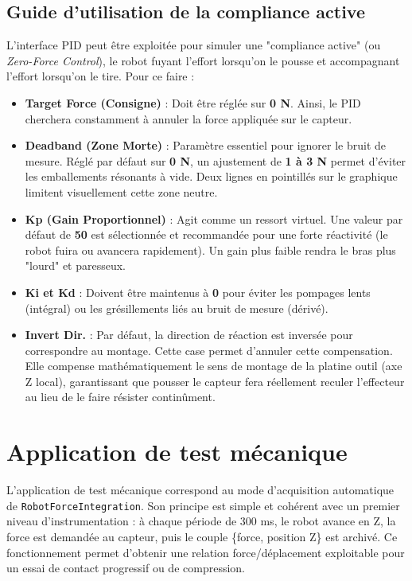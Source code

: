 \documentclass[11pt,a4paper]{article}
\begin{document}
\subsection{Guide d'utilisation de la compliance active}
L'interface PID peut \^etre exploit\'ee pour simuler une "compliance active" (ou \emph{Zero-Force Control}), le robot fuyant l'effort lorsqu'on le pousse et accompagnant l'effort lorsqu'on le tire. Pour ce faire :
\begin{itemize}
    \item \textbf{Target Force (Consigne)} : Doit \^etre r\'egl\'ee sur \textbf{0 N}. Ainsi, le PID cherchera constamment \`a annuler la force appliqu\'ee sur le capteur.
    \item \textbf{Deadband (Zone Morte)} : Param\`etre essentiel pour ignorer le bruit de mesure. R\'egl\'e par d\'efaut sur \textbf{0 N}, un ajustement de \textbf{1 \`a 3 N} permet d'\'eviter les emballements r\'esonants \`a vide. Deux lignes en pointill\'es sur le graphique limitent visuellement cette zone neutre.
    \item \textbf{Kp (Gain Proportionnel)} : Agit comme un ressort virtuel. Une valeur par d\'efaut de \textbf{50} est s\'electionn\'ee et recommand\'ee pour une forte r\'eactivit\'e (le robot fuira ou avancera rapidement). Un gain plus faible rendra le bras plus "lourd" et paresseux.
    \item \textbf{Ki et Kd} : Doivent \^etre maintenus \`a \textbf{0} pour \'eviter les pompages lents (int\'egral) ou les gr\'esillements li\'es au bruit de mesure (d\'eriv\'e).
    \item \textbf{Invert Dir.} : Par d\'efaut, la direction de r\'eaction est invers\'ee pour correspondre au montage. Cette case permet d'annuler cette compensation. Elle compense math\'ematiquement le sens de montage de la platine outil (axe Z local), garantissant que pousser le capteur fera r\'eellement reculer l'effecteur au lieu de le faire r\'esister contin\^ument.
\end{itemize}

\section{Application de test m\'ecanique}
\label{sec:testmeca}
L'application de test m\'ecanique correspond au mode d'acquisition automatique de \texttt{RobotForceIntegration}. Son principe est simple et coh\'erent avec un premier niveau d'instrumentation : \`a chaque p\'eriode de 300 ms, le robot avance en Z, la force est demand\'ee au capteur, puis le couple \{force, position Z\} est archiv\'e. Ce fonctionnement permet d'obtenir une relation force/d\'eplacement exploitable pour un essai de contact progressif ou de compression.
\end{document}
